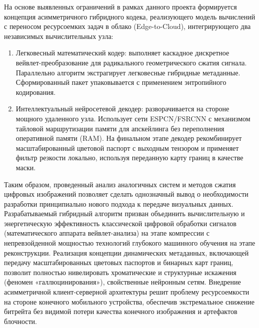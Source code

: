 На основе выявленных ограничений в рамках данного проекта формируется концепция асимметричного гибридного кодека, реализующего модель вычислений с переносом ресурсоемких задач в облако (Edge-to-Cloud), интегрирующего два независимых вычислительных узла:

\begin{enumerate}
\item Легковесный математический кодер: выполняет каскадное дискретное вейвлет-преобразование для радикального геометрического сжатия сигнала. Параллельно алгоритм экстрагирует легковесные гибридные метаданные. Сформированный пакет упаковывается с применением энтропийного кодирования.

\item Интеллектуальный нейросетевой декодер: разворачивается на стороне мощного удаленного узла. Использует сети ESPCN/FSRCNN с механизмом тайловой маршрутизации памяти для апскейлинга без переполнения оперативной памяти (RAM). На финальном этапе декодер рекомбинирует масштабированный цветовой паспорт с выходным тензором и применяет фильтр резкости локально, используя переданную карту границ в качестве маски.
\end{enumerate}

Таким образом, проведенный анализ аналогичных систем и методов сжатия цифровых изображений позволяет сделать однозначный вывод о необходимости разработки принципиально нового подхода к передаче визуальных данных. Разрабатываемый гибридный алгоритм призван объединить вычислительную и энергетическую эффективность классической цифровой обработки сигналов (математического аппарата вейвлет-анализа) на этапе компрессии с непревзойденной мощностью технологий глубокого машинного обучения на этапе реконструкции. Реализация концепции динамических метаданных, включающей передачу масштабированных цветовых паспортов и бинарных карт границ, позволит полностью нивелировать хроматические и структурные искажения (феномен «галлюцинирования»), свойственные нейронным сетям. Внедрение асимметричной клиент-серверной архитектуры решит проблему ресурсоемкости на стороне конечного мобильного устройства, обеспечив экстремальное снижение битрейта без видимой потери качества конечного изображения и артефактов блочности.